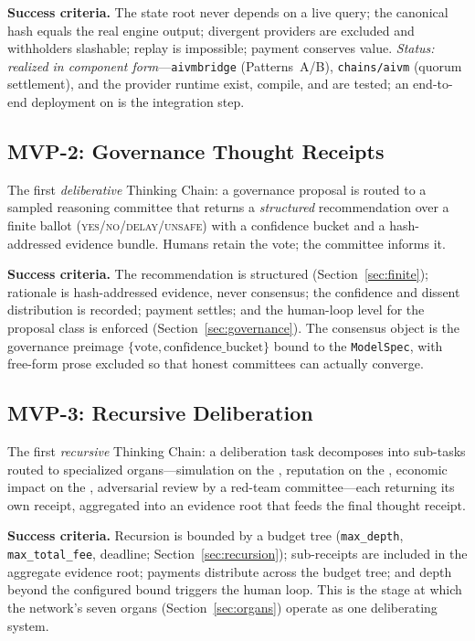 \textbf{Success criteria.} The \CChain{} state root never depends on a live \AChain{} query; the canonical hash equals the real engine output; divergent providers are excluded and withholders slashable; replay is impossible; payment conserves value. \emph{Status: realized in component form}---\texttt{aivmbridge} (Patterns~A/B), \texttt{chains/aivm} (quorum settlement), and the \Hanzo{} provider runtime exist, compile, and are tested; an end-to-end deployment on \Beluga{} is the integration step.

\subsection{MVP-2: Governance Thought Receipts}

The first \emph{deliberative} Thinking Chain: a governance proposal is routed to a sampled reasoning committee that returns a \emph{structured} recommendation over a finite ballot (\textsc{yes}/\textsc{no}/\textsc{delay}/\textsc{unsafe}) with a confidence bucket and a hash-addressed evidence bundle. Humans retain the vote; the committee informs it.

\textbf{Success criteria.} The recommendation is structured (Section~\ref{sec:finite}); rationale is hash-addressed evidence, never consensus; the confidence and dissent distribution is recorded; payment settles; and the human-loop level for the proposal class is enforced (Section~\ref{sec:governance}). The consensus object is the governance preimage $\{\text{vote}, \text{confidence\_bucket}\}$ bound to the \texttt{ModelSpec}, with free-form prose excluded so that honest committees can actually converge.

\subsection{MVP-3: Recursive Deliberation}

The first \emph{recursive} Thinking Chain: a deliberation task decomposes into sub-tasks routed to specialized organs---simulation on the \SChain{}, reputation on the \RChain{}, economic impact on the \DChain{}, adversarial review by a red-team committee---each returning its own receipt, aggregated into an evidence root that feeds the final thought receipt.

\textbf{Success criteria.} Recursion is bounded by a budget tree (\texttt{max\_depth}, \texttt{max\_total\_fee}, deadline; Section~\ref{sec:recursion}); sub-receipts are included in the aggregate evidence root; payments distribute across the budget tree; and depth beyond the configured bound triggers the human loop. This is the stage at which the network's seven organs (Section~\ref{sec:organs}) operate as one deliberating system.

